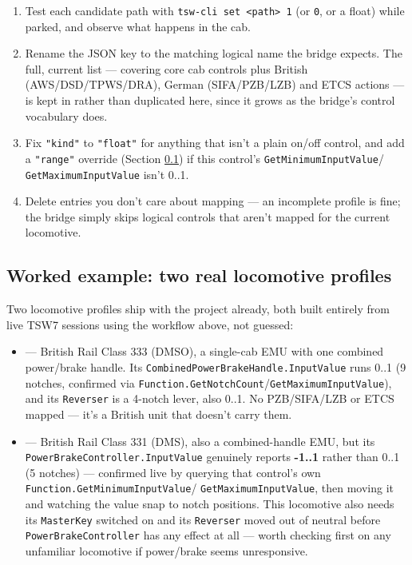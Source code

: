\documentclass[11pt,a4paper]{article}
\newcommand{\code}[1]{\texttt{#1}}
\begin{document}
\begin{enumerate}[leftmargin=1.5em]
    \item Test each candidate path with \code{tsw-cli set <path> 1} (or
    \code{0}, or a float) while parked, and observe what happens in the
    cab.
    \item Rename the JSON key to the matching logical name the bridge
    expects. The full, current list --- covering core cab controls plus
    British (AWS/DSD/TPWS/DRA), German (SIFA/PZB/LZB) and ETCS actions
    --- is kept in  rather than duplicated here,
    since it grows as the bridge's control vocabulary does.
    \item Fix \code{"kind"} to \code{"float"} for anything that isn't a
    plain on/off control, and add a \code{"range"} override (Section
    \ref{sec:worked-examples}) if this control's \code{GetMinimumInputValue}/
    \code{GetMaximumInputValue} isn't 0..1.
    \item Delete entries you don't care about mapping --- an incomplete
    profile is fine; the bridge simply skips logical controls that
    aren't mapped for the current locomotive.
\end{enumerate}

\subsection{Worked example: two real locomotive profiles}
\label{sec:worked-examples}

Two locomotive profiles ship with the project already, both built
entirely from live TSW7 sessions using the workflow above, not guessed:

\begin{itemize}[leftmargin=1.5em]
    \item {} --- British
    Rail Class 333 (DMSO), a single-cab EMU with one combined
    power/brake handle. Its \code{CombinedPowerBrakeHandle.InputValue}
    runs 0..1 (9 notches, confirmed via
    \code{Function.GetNotchCount}/\code{GetMaximumInputValue}), and its
    \code{Reverser} is a 4-notch lever, also 0..1. No PZB/SIFA/LZB or
    ETCS mapped --- it's a British unit that doesn't carry them.
    \item {} --- British Rail
    Class 331 (DMS), also a combined-handle EMU, but its
    \code{PowerBrakeController.InputValue} genuinely reports \textbf{-1..1}
    rather than 0..1 (5 notches) --- confirmed live by querying that
    control's own \code{Function.GetMinimumInputValue}/
    \code{GetMaximumInputValue}, then moving it and watching the value
    snap to notch positions. This locomotive also needs its
    \code{MasterKey} switched on and its \code{Reverser} moved out of
    neutral before \code{PowerBrakeController} has any effect at all ---
    worth checking first on any unfamiliar locomotive if power/brake
    seems unresponsive.
\end{itemize}
\end{document}
